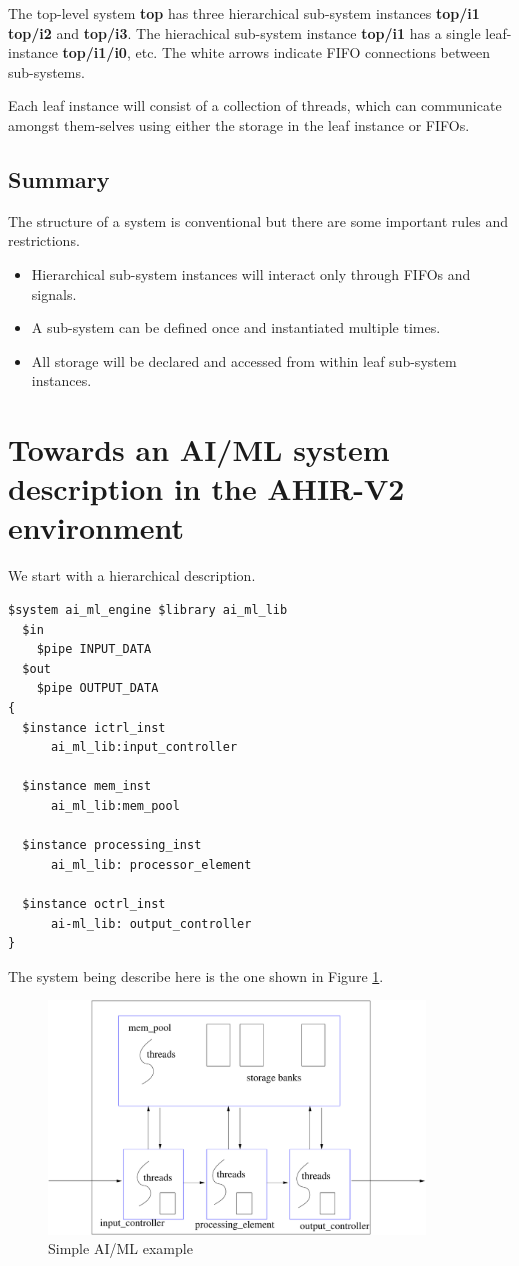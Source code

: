 \documentclass{article}
\begin{document}
The top-level system {\bf top} has three hierarchical sub-system instances {\bf top/i1}
{\bf top/i2} and {\bf top/i3}.  The hierachical sub-system instance {\bf top/i1} has
a single leaf-instance {\bf top/i1/i0}, etc.     The white arrows indicate FIFO
connections between sub-systems.

Each leaf instance will consist of a collection of threads, which can communicate
amongst them-selves using either the storage in the leaf instance or FIFOs.

\subsection{Summary}

The structure of a system is conventional but there are some important 
rules and restrictions.
\begin{itemize}
\item Hierarchical sub-system instances will interact only through FIFOs and signals.
\item A sub-system can be defined once and instantiated multiple times.
\item All storage will be declared and accessed from within leaf sub-system instances.
\end{itemize}

\section{Towards an AI/ML system description in the AHIR-V2 environment}

We start with a hierarchical description.  

\begin{verbatim}
$system ai_ml_engine $library ai_ml_lib
  $in
    $pipe INPUT_DATA
  $out
    $pipe OUTPUT_DATA
{
  $instance ictrl_inst 
      ai_ml_lib:input_controller

  $instance mem_inst
      ai_ml_lib:mem_pool 

  $instance processing_inst
      ai_ml_lib: processor_element 

  $instance octrl_inst
      ai-ml_lib: output_controller 
} 
\end{verbatim}

The system being describe here is the one shown in Figure \ref{fig:simpleExample}.
\begin{figure}
\centering
\includegraphics[width=10cm]{figs/simpleExample.pdf}
\caption{Simple AI/ML example}
\label{fig:simpleExample}
\end{figure}
\end{document}

